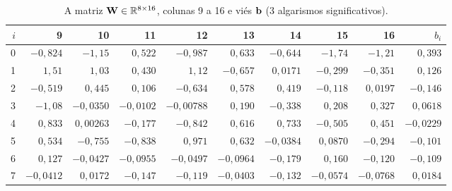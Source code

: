 \documentclass[11pt,a4paper]{article}
\begin{document}
\begin{table}[H]
\centering
\caption{A matriz $\mathbf{W}\in\mathbb{R}^{8\times16}$, colunas 9 a 16 e viés $\mathbf{b}$ (3 algarismos significativos).}\label{tab:W1}
\footnotesize
\begin{tabular}{rrrrrrrrrr}
\toprule
$i$ & 9 & 10 & 11 & 12 & 13 & 14 & 15 & 16 & $b_i$ \\
\midrule
0 & $-0,824$ & $-1,15$ & $0,522$ & $-0,987$ & $0,633$ & $-0,644$ & $-1,74$ & $-1,21$ & $0,393$ \\
1 & $1,51$ & $1,03$ & $0,430$ & $1,12$ & $-0,657$ & $0,0171$ & $-0,299$ & $-0,351$ & $0,126$ \\
2 & $-0,519$ & $0,445$ & $0,106$ & $-0,634$ & $0,578$ & $0,419$ & $-0,118$ & $0,0197$ & $-0,146$ \\
3 & $-1,08$ & $-0,0350$ & $-0,0102$ & $-0,00788$ & $0,190$ & $-0,338$ & $0,208$ & $0,327$ & $0,0618$ \\
4 & $0,833$ & $0,00263$ & $-0,177$ & $-0,842$ & $0,616$ & $0,733$ & $-0,505$ & $0,451$ & $-0,0229$ \\
5 & $0,534$ & $-0,755$ & $-0,838$ & $0,971$ & $0,632$ & $-0,0384$ & $0,0870$ & $-0,294$ & $-0,101$ \\
6 & $0,127$ & $-0,0427$ & $-0,0955$ & $-0,0497$ & $-0,0964$ & $-0,179$ & $0,160$ & $-0,120$ & $-0,109$ \\
7 & $-0,0412$ & $0,0172$ & $-0,147$ & $-0,119$ & $-0,0403$ & $-0,132$ & $-0,0574$ & $-0,0768$ & $0,0184$ \\
\bottomrule
\end{tabular}
\par\vspace{2pt}{\footnotesize Fonte: elaborado pelo autor.}
\end{table}
\end{document}

